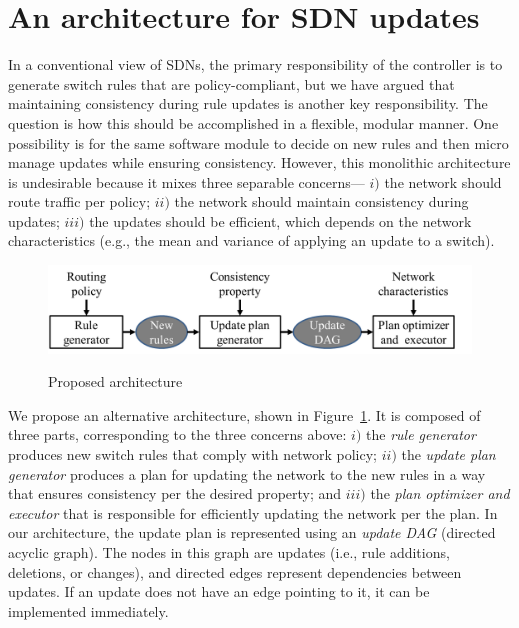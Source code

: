 \section{An architecture for SDN updates}
\label{sec:discussion}

In a conventional view of SDNs, the primary responsibility of the controller is to generate switch rules that are policy-compliant, but we have argued that maintaining consistency during rule updates is another key responsibility. The question is how this should be accomplished in a flexible, modular manner. One possibility is for the same software module to decide on new rules and then micro manage updates while ensuring consistency. However, this monolithic architecture is undesirable because it mixes three separable concerns--- $i)$ the network should route traffic per policy; $ii)$ the network should maintain consistency during updates; $iii)$ the updates should be efficient, which depends on the network characteristics (e.g., the mean and variance of applying an update to a switch).

\begin{figure}[t!]
  \centering
  \includegraphics[width=\columnwidth]{figures/arch.png}\\
  \caption{Proposed architecture}\label{fig:arch}
\end{figure}



We propose an alternative architecture, shown in Figure~\ref{fig:arch}. It is composed of three parts, corresponding to the three concerns above: $i)$ the {\em rule generator} produces new switch rules that comply with network policy; $ii)$ the {\em update plan generator} produces a plan for updating the network to the new rules in a way that ensures consistency per the desired property; and $iii)$  the {\em plan optimizer and executor} that is responsible for efficiently updating the network per the plan. In our architecture, the update plan is represented using an {\em update DAG} (directed acyclic graph). The nodes in this graph are updates (i.e., rule additions, deletions, or changes), and directed edges represent dependencies between updates. If an update does not have an edge pointing to it, it can be implemented immediately.


